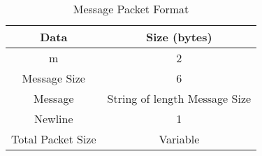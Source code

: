 \begin{table}[!ht]
\centering
\caption{Message Packet Format} 
\label{tab:DataPacket}
\bigskip
\begin{tabular}{|c|c|}
\hline
\multicolumn{1}{|c|}{\bfseries Data} & \multicolumn{1}{c|}{\bfseries Size (bytes)}\\
\hline
    m						& 2		\\ \hline 
    Message Size 				& 6		\\ \hline
    Message					& String of length Message Size		\\ \hline %
    Newline					& 1		\\ \hline
    Total Packet Size				& Variable		\\ \hline
    
\end{tabular}
\medskip
\end{table}


